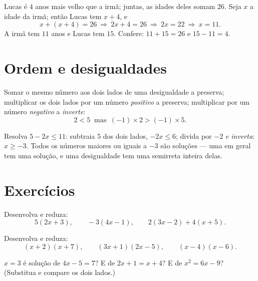 \begin{example}\label{ex:g8:equations:problem}
Lucas é $4$ anos mais velho que a irmã; juntas, as idades deles somam
$26$. Seja $x$ a idade da irmã; então Lucas tem $x + 4$, e
\[
x + (x + 4) = 26
\ \Longrightarrow\
2x + 4 = 26
\ \Longrightarrow\
2x = 22
\ \Longrightarrow\
x = 11 .
\]
A irmã tem $11$ anos e Lucas tem $15$. Confere: $11 + 15 = 26$ e
$15 - 11 = 4$.
\end{example}

\section{Ordem e desigualdades}

\begin{proposition}\label{prop:g8:equations:order}
Somar o mesmo número aos dois lados de uma desigualdade a preserva;
multiplicar os dois lados por um número \emph{positivo} a preserva;
multiplicar por um número \emph{negativo} a \emph{inverte}:
\[
2 < 5 \ \text{ mas }\ (-1) \times 2 > (-1) \times 5 .
\]
\end{proposition}
\admitted

\begin{example}\label{ex:g8:equations:inequality}
Resolva $5 - 2x \leq 11$: subtraia $5$ dos dois lados, $-2x \leq 6$;
divida por $-2$ \emph{e inverta}: $x \geq -3$. Todos os números maiores
ou iguais a $-3$ são soluções --- uma  em geral tem uma solução,
e uma desigualdade tem uma semirreta inteira delas.
\end{example}

\section{Exercícios}

\begin{exercise}[$\star$]\label{exo:g8:equations:1}
Desenvolva e reduza:
\[
5(2x + 3), \qquad
-3(4x - 1), \qquad
2(3x - 2) + 4(x + 5).
\]
\end{exercise}

\begin{exercise}[$\star$]\label{exo:g8:equations:2}
Desenvolva e reduza:
\[
(x + 2)(x + 7), \qquad
(3x + 1)(2x - 5), \qquad
(x - 4)(x - 6).
\]
\end{exercise}

\begin{exercise}[$\star$]\label{exo:g8:equations:3}
$x = 3$ é solução de $4x - 5 = 7$? E de $2x + 1 = x + 4$? E de
$x^2 = 6x - 9$? (Substitua e compare os dois lados.)
\end{exercise}

